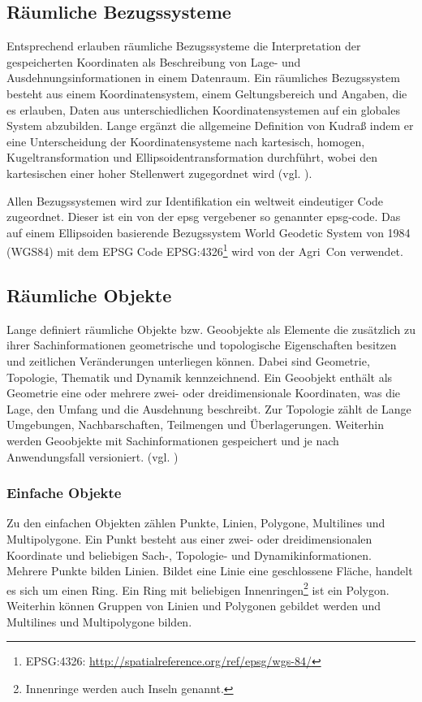 \subsection{Räumliche Bezugssysteme}
Entsprechend \cite[S.506]{book:kudrass} erlauben räumliche Bezugssysteme die Interpretation der gespeicherten Koordinaten als Beschreibung von Lage- und Ausdehnungsinformationen in einem Datenraum. Ein räumliches Bezugssystem besteht aus einem Koordinatensystem, einem Geltungsbereich und Angaben, die es erlauben, Daten aus unterschiedlichen Koordinatensystemen auf ein globales System abzubilden.
Lange ergänzt die allgemeine Definition von Kudraß indem er eine Unterscheidung der Koordinatensysteme nach kartesisch, homogen, Kugeltransformation und Ellipsoidentransformation durchführt, wobei den kartesischen einer hoher Stellenwert zugegordnet wird (vgl. \cite[S.141 ff.]{book:gi-theopluspraxis3}).

Allen Bezugssystemen wird zur Identifikation ein weltweit eindeutiger Code zugeordnet.
Dieser ist ein von der \Gls{epsg} vergebener so genannter \Gls{epsg-code}.
Das auf einem Ellipsoiden basierende Bezugssystem World Geodetic System von 1984 (WGS84) mit dem EPSG Code EPSG:4326\footnote{EPSG:4326: \url{http://spatialreference.org/ref/epsg/wgs-84/}} wird von der Agri~Con verwendet.


\subsection{Räumliche Objekte}
Lange definiert räumliche Objekte bzw. Geoobjekte als Elemente die zusätzlich zu ihrer Sachinformationen geometrische und topologische Eigenschaften besitzen und zeitlichen Veränderungen unterliegen können. Dabei sind Geometrie, Topologie, Thematik und Dynamik kennzeichnend.
Ein Geoobjekt enthält als Geometrie eine oder mehrere zwei- oder dreidimensionale Koordinaten, was die Lage, den Umfang und die Ausdehnung beschreibt.
Zur Topologie zählt de Lange Umgebungen, Nachbarschaften, Teilmengen und Überlagerungen.
Weiterhin werden Geoobjekte mit Sachinformationen gespeichert und je nach Anwendungsfall versioniert. (vgl. \cite[S.133]{book:gi-theopluspraxis3})


\subsubsection{Einfache Objekte}
Zu den einfachen Objekten zählen Punkte, Linien, Polygone, Multilines und Multipolygone.
Ein Punkt besteht aus einer zwei- oder dreidimensionalen Koordinate und beliebigen Sach-, Topologie- und Dynamikinformationen.
Mehrere Punkte bilden Linien.
Bildet eine Linie eine geschlossene Fläche, handelt es sich um einen Ring.
Ein Ring mit beliebigen Innenringen\footnote{Innenringe werden auch Inseln genannt.} ist ein Polygon.
Weiterhin können Gruppen von Linien und Polygonen gebildet werden und Multilines und Multipolygone bilden.

